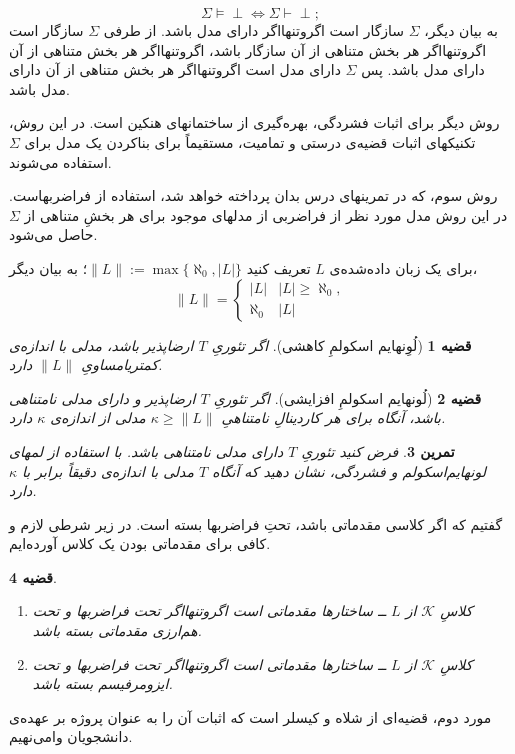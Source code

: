 \documentclass[12pt,a4paper]{report}
\theoremstyle{colorhead}
\newtheorem{thm}{قضیه}
\newtheorem{tam}[thm]{تمرین}
\begin{document}
\[
\Sigma\models \perp \Leftrightarrow \Sigma\vdash \perp;
\]
به بیان دیگر،
$\Sigma$
سازگار 
است اگروتنهااگر دارای مدل باشد.  از طرفی 
$\Sigma$
سازگار است 
اگروتنهااگر هر بخش متناهی از آن سازگار باشد، اگروتنهااگر هر بخش متناهی از آن دارای مدل باشد. پس 
$\Sigma$
دارای مدل است اگروتنهااگر هر بخش متناهی از آن دارای مدل باشد.
\par 
روش دیگر برای اثبات فشردگی، بهره‌گیری از ساختمانهای هنکین
 است.  در این روش، تکنیکهای اثبات قضیه‌ی درستی و تمامیت، مستقیماً برای بناکردن یک مدل برای
$\Sigma$
استفاده می‌شوند. 
\par 
روش سوم، که در تمرینهای درس بدان پرداخته خواهد شد، استفاده از فراضربهاست. در این روش مدل مورد نظر از فراضربی از
مدلهای موجود برای هر بخشِ متناهی 
از
$\Sigma$
حاصل می‌شود.
\par 
برای یک زبان داده‌شده‌ی 
$L$
تعریف 
کنید
$\|L\|:=\max\{\aleph_0,|L|\}$؛
به بیان دیگر،
\[
\|L\|=\begin{cases}
|L| & |L|\geq \aleph_0,
\\
\aleph_0 & |L|
\end{cases}
\]
\begin{thm}[لُوِنهایم اسکولمِ کاهشی]
اگر تئوریِ
$T$
ارضاپذیر باشد،  مدلی با اندازه‌ی کمتریامساویِ
$\|L\|$
دارد. 
\end{thm}
\begin{thm}[لُونهایم اسکولمِ افزایشی]
اگر تئوریِ
$T$
ارضاپذیر 
و دارای مدلی نامتناهی باشد،
آنگاه برای هر کاردینالِ نامتناهیِ 
$\kappa\geq \|L\|$
مدلی از اندازه‌ی
$\kappa$
دارد. 
\end{thm}
\begin{tam}
فرض کنید تئوریِ
$T$
 دارای 
 مدلی نامتناهی باشد. با استفاده از لمهای لونهایم‌اسکولم و فشردگی، نشان دهید که 
 آنگاه 
 $T$
 مدلی با اندازه‌ی
دقیقاً
برابر با
$\kappa$
 دارد. 
\end{tam}
گفتیم که اگر کلاسی مقدماتی باشد، تحتِ فراضربها بسته است. در زیر شرطی لازم و کافی برای مقدماتی بودن یک کلاس آورده‌ایم.
\begin{thm}
\hfill
\begin{enumerate}
\item 
کلاسِ
$\mathcal{K}$
از
$L$  ــ‌
ساختارها مقدماتی است اگروتنهااگر تحت فراضربها و تحت هم‌ارزی مقدماتی بسته باشد.
\item 
کلاسِ
$\mathcal{K}$
از
$L$  ــ‌
ساختارها مقدماتی است اگروتنهااگر تحت فراضربها و تحت ایزومرفیسم بسته باشد.
\end{enumerate}
\end{thm}
مورد دوم، قضیه‌ای از شلاه و کیسلر 
است که اثبات آن را به عنوان پروژه بر عهده‌ی دانشجویان وامی‌نهیم. 
\end{document}

